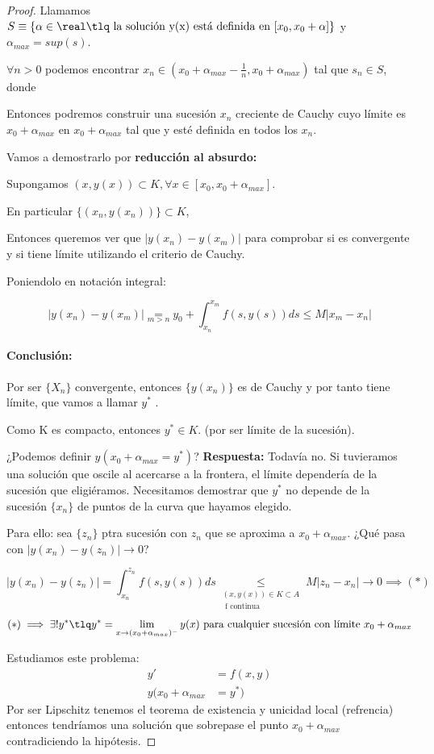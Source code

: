 \documentclass[nochap]{apuntes}
\begin{document}
\begin{proof}
Llamamos $S\equiv \{\alpha\in\real \tlq \text{ la solución y(x) está definida en } [x_0,x_0+\alpha] \}$ y $\alpha_{max} = sup(s)$.

$\forall n>0$ podemos encontrar $x_n \in \left(x_0 + \alpha_{max} - \frac{1}{n},x_0+\alpha_{max}\right)$ tal que $s_n\in S$, donde 

Entonces podremos construir una sucesión $x_n$ creciente de Cauchy cuyo límite es $x_0+\alpha_{max}$ en $x_0 + \alpha_{max}$ tal que y esté definida en todos los $x_n$.

Vamos a demostrarlo por \textbf{reducción al absurdo:}

Supongamos $(x,y(x))\subset K, \forall x\in[x_0,x_0+\alpha_{max}]$.

En particular $\{(x_n,y(x_n))\}\subset K$,


Entonces queremos ver que $| y(x_n) - y(x_m)|$ para comprobar si es convergente y si tiene límite utilizando el criterio de Cauchy.

Poniendolo en notación integral:

\[| y(x_n) - y(x_m)| \underset{m>n}{=} y_0 + \int_{x_n}^{x_m} f(s,y(s))ds \leq M |x_m-x_n| \]

\paragraph{Conclusión:}
Por ser $\{X_n\}$ convergente, entonces $\{y(x_n)\}$ es de Cauchy y por tanto tiene límite, que vamos a llamar $y^{\ast}$ .

Como K es compacto, entonces $y^{\ast}\in K$. (por ser límite de la sucesión).

¿Podemos definir $y(x_0+\alpha_{max} = y^{\ast})$? 
\textbf{Respuesta:} Todavía no. Si tuvieramos una solución que oscile al acercarse a la frontera, el límite dependería de la sucesión que eligiéramos. Necesitamos demostrar que $y^{\ast}$ no depende de la sucesión $\{x_n\}$ de puntos de la curva que hayamos elegido.

Para ello: sea $\{z_n\}$ ptra sucesión con $z_n$ que se aproxima a $x_0+\alpha_{max}$. ¿Qué pasa con $|y(x_n) - y(z_n)| \to 0$? 


\[|y(x_n) - y(z_n)| = \int_{x_n}^{z_n} f(s,y(s))ds \underset{\begin{array}{c}(x,y(x))\in K \subset A\\\text{ f continua }\end{array}}{\leq}M |z_n - x_n| \to 0 \implies (*) \]
\[(*) \implies \exists!y^{\ast} \tlq y^{\ast} = \lim_{x\to (x_0+\alpha_{max})^{-}} y(x) \text{ para cualquier sucesión con límite } x_0+\alpha_{max}\]


Estudiamos este problema:
\[\begin{array}{cc}
y' &= f(x,y)\\
y(x_0+\alpha_{max} &= y^{\ast})
\end{array}\]
Por ser Lipschitz tenemos el teorema de existencia y unicidad local (refrencia) entonces tendríamos una solución que sobrepase el punto $x_0+\alpha_{max}$ contradiciendo la hipótesis.

\end{proof}
\end{document}

